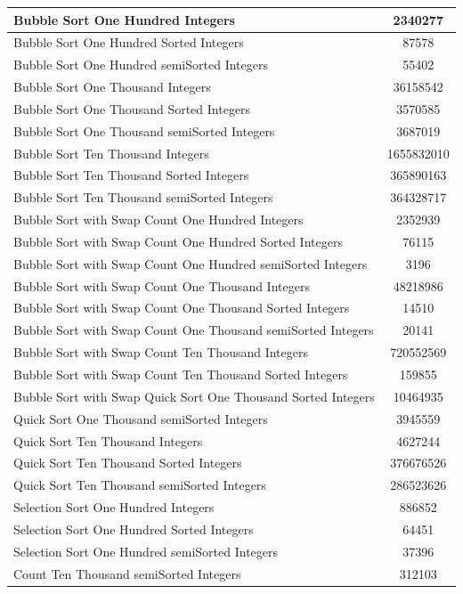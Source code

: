 \documentclass[]{article}
\begin{document}
	\begin{tabular}{|l|c|}
		\hline
		Bubble Sort One Hundred Integers & 2340277\\
		\hline
		Bubble Sort One Hundred Sorted Integers & 87578\\
		\hline
		Bubble Sort One Hundred semiSorted Integers & 55402\\
		\hline
		Bubble Sort One Thousand Integers & 36158542\\
		\hline
		Bubble Sort One Thousand Sorted Integers & 3570585\\
		\hline
		Bubble Sort One Thousand semiSorted Integers & 3687019\\
		\hline
		Bubble Sort Ten Thousand Integers & 1655832010\\
		\hline
		Bubble Sort Ten Thousand Sorted Integers & 365890163\\
		\hline
		Bubble Sort Ten Thousand semiSorted Integers & 364328717\\
		\hline
		Bubble Sort with Swap Count One Hundred Integers & 2352939\\
		\hline
		Bubble Sort with Swap Count One Hundred Sorted Integers & 76115\\
		\hline
		Bubble Sort with Swap Count One Hundred semiSorted Integers & 3196\\
		\hline
		Bubble Sort with Swap Count One Thousand Integers & 48218986\\
		\hline
		Bubble Sort with Swap Count One Thousand Sorted Integers & 14510\\
		\hline
		Bubble Sort with Swap Count One Thousand semiSorted Integers & 20141\\
		\hline
		Bubble Sort with Swap Count Ten Thousand Integers & 720552569\\
		\hline
		Bubble Sort with Swap Count Ten Thousand Sorted Integers & 159855\\
		\hline
		Bubble Sort with Swap
		Quick Sort One Thousand Sorted Integers & 10464935\\
		\hline
		Quick Sort One Thousand semiSorted Integers & 3945559\\
		\hline
		Quick Sort Ten Thousand Integers & 4627244\\
		\hline
		Quick Sort Ten Thousand Sorted Integers & 376676526\\
		\hline
		Quick Sort Ten Thousand semiSorted Integers & 286523626\\
		\hline
		Selection Sort One Hundred Integers & 886852\\
		\hline
		Selection Sort One Hundred Sorted Integers & 64451\\
		\hline
		Selection Sort One Hundred semiSorted Integers & 37396\\
		 Count Ten Thousand semiSorted Integers & 312103\\
		\hline
	\end{tabular}
\end{document}
